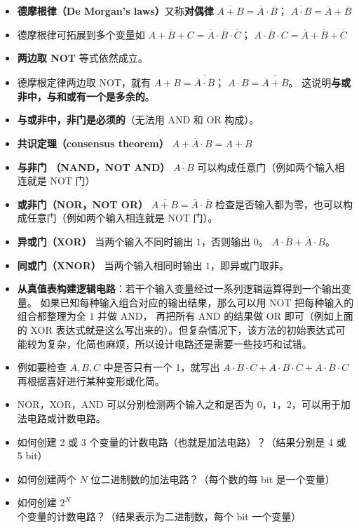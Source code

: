 \begin{itemize}
\item \textbf{德摩根律（De Morgan's laws）}又称\textbf{对偶律} $\overline{A+B} = \overline A \cdot \overline B$； $\overline{A \cdot B} = \overline A + \overline B$
\item 德摩根律可拓展到多个变量如 $\overline{A+B+C} = \overline A \cdot \overline B \cdot \overline C$； $\overline{A \cdot B\cdot C} = \overline A + \overline B + \overline C$
\item \textbf{两边取 NOT} 等式依然成立。
\item 德摩根定律两边取 NOT，就有 $A+B = \overline{\overline A \cdot \overline B}$； $A \cdot B = \overline{\overline A + \overline B}$。 这说明\textbf{与或非中，与和或有一个是多余的}。
\item \textbf{与或非中，非门是必须的}（无法用 AND 和 OR 构成）。
\item \textbf{共识定理（consensus theorem）} $A + \overline A \cdot B = A + B$
\item \textbf{与非门 （NAND，NOT AND）} $\overline{A\cdot B}$ 可以构成任意门（例如两个输入相连就是 NOT 门）
\item \textbf{或非门（NOR，NOT OR）} $\overline{A+B}=\overline A\cdot\overline B$ 检查是否输入都为零，也可以构成任意门（例如两个输入相连就是 NOT 门）。
\item \textbf{异或门（XOR）} 当两个输入不同时输出 $1$，否则输出 $0$。 $A\cdot\overline B+\overline A\cdot B$。
\item \textbf{同或门（XNOR）} 当两个输入相同时输出 $1$，即异或门取非。
\item \textbf{从真值表构建逻辑电路}：若干个输入变量经过一系列逻辑运算得到一个输出变量。 如果已知每种输入组合对应的输出结果，那么可以用 NOT 把每种输入的组合都整理为全 1 并做 AND， 再把所有 AND 的结果做 OR 即可（例如上面的 XOR 表达式就是这么写出来的）。但复杂情况下，该方法的初始表达式可能较为复杂，化简也麻烦，所以设计电路还是需要一些技巧和试错。
\item 例如要检查 $A,B,C$ 中是否只有一个 1，就写出 $A\cdot\overline B\cdot\overline C + \overline A\cdot B\cdot\overline C + \overline A\cdot\overline B\cdot C$ 再根据喜好进行某种变形或化简。
\item NOR，XOR，AND 可以分别检测两个输入之和是否为 $0$，$1$，$2$，可以用于加法电路或计数电路。
\end{itemize}

\begin{exercise}{}
\begin{itemize}
\item 如何创建 2 或 3 个变量的计数电路（也就是加法电路）？（结果分别是 4 或 5 bit）
\item 如何创建两个 $N$ 位二进制数的加法电路？（每个数的每 bit 是一个变量）
\item 如何创建 $2^N$ 个变量的计数电路？（结果表示为二进制数，每个 bit 一个变量）
\end{itemize}
\end{exercise}
